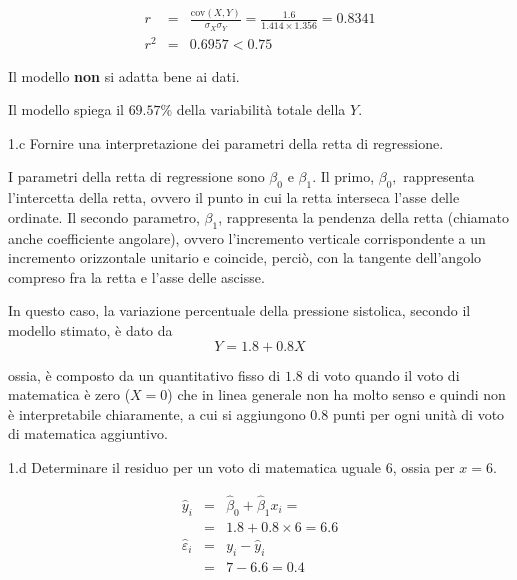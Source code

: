 \documentclass[
  11pt,
]{book}
\theoremstyle{mytheoremstyle}
\theoremstyle{mydefstyle}
\newenvironment{sol}
  {
  \begin{tcolorbox}[enhanced,breakable,arc=0.1mm,boxrule=1pt,colback=white,colframe=iblue,
  title=\bf \fontfamily{lmss}\selectfont \hspace{.5 cm} Soluzione,drop fuzzy shadow]

}{
\end{tcolorbox}
  }
\begin{document}
\begin{sol}
\begin{eqnarray*}
r&=&\frac{\text{cov}(X,Y)}{\sigma_X\sigma_Y}=\frac{ 1.6 }{ 1.414 \times 1.356 }= 0.8341 \\ 
r^2&=& 0.6957 < 0.75
\end{eqnarray*}

Il modello \textbf{non} si adatta bene ai dati.

Il modello spiega il \(69.57\%\) della variabilità totale della \(Y\).

\end{sol}

1.c Fornire una interpretazione dei parametri della retta di regressione.

\begin{sol}
I parametri della retta di regressione sono \(\beta_{0}\) e \(\beta_{1}\).
Il primo, \(\beta_{0},\) rappresenta l'intercetta della retta,
ovvero il punto in cui la retta interseca l'asse delle ordinate.
Il secondo parametro, \(\beta_{1}\), rappresenta la pendenza della
retta (chiamato anche coefficiente angolare), ovvero l'incremento
verticale corrispondente a un incremento orizzontale unitario e
coincide, perciò, con la tangente dell'angolo compreso fra la
retta e l'asse delle ascisse.

In questo caso, la variazione percentuale della pressione sistolica,
secondo il modello stimato, è dato da
\[Y= 1.8 + 0.8 X\]

ossia, è composto da un quantitativo fisso di \(1.8\) di voto
quando il voto di matematica è zero (\(X=0\)) che in linea
generale non ha molto senso e quindi non è interpretabile
chiaramente, a cui si aggiungono \(0.8\) punti per ogni unità
di voto di matematica aggiuntivo.

\end{sol}

1.d Determinare il residuo per un voto di matematica
uguale 6, ossia per \(x=6\).

\begin{sol}
\begin{eqnarray*}
\hat y_i &=&\hat\beta_0+\hat\beta_1 x_i=\\ 
&=& 1.8 + 0.8 \times 6 = 6.6 \\ 
\hat \varepsilon_i &=& y_i-\hat y_i\\ 
&=& 7 - 6.6 = 0.4  
\end{eqnarray*}

\end{sol}
\end{document}

